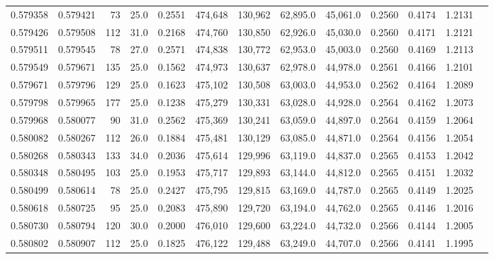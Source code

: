 \begin{tabular}{rrrrrrrrrrrrr}
0.579358 & 0.579421 &    73 & 25.0 &                                     0.2551 & 474,648 & 130,962 &  62,895.0 &  45,061.0 & 0.2560 & 0.4174 & 1.2131 \\
0.579426 & 0.579508 &   112 & 31.0 &                                     0.2168 & 474,760 & 130,850 &  62,926.0 &  45,030.0 & 0.2560 & 0.4171 & 1.2121 \\
0.579511 & 0.579545 &    78 & 27.0 &                                     0.2571 & 474,838 & 130,772 &  62,953.0 &  45,003.0 & 0.2560 & 0.4169 & 1.2113 \\
0.579549 & 0.579671 &   135 & 25.0 &                                     0.1562 & 474,973 & 130,637 &  62,978.0 &  44,978.0 & 0.2561 & 0.4166 & 1.2101 \\
0.579671 & 0.579796 &   129 & 25.0 &                                     0.1623 & 475,102 & 130,508 &  63,003.0 &  44,953.0 & 0.2562 & 0.4164 & 1.2089 \\
0.579798 & 0.579965 &   177 & 25.0 &                                     0.1238 & 475,279 & 130,331 &  63,028.0 &  44,928.0 & 0.2564 & 0.4162 & 1.2073 \\
0.579968 & 0.580077 &    90 & 31.0 &                                     0.2562 & 475,369 & 130,241 &  63,059.0 &  44,897.0 & 0.2564 & 0.4159 & 1.2064 \\
0.580082 & 0.580267 &   112 & 26.0 &                                     0.1884 & 475,481 & 130,129 &  63,085.0 &  44,871.0 & 0.2564 & 0.4156 & 1.2054 \\
0.580268 & 0.580343 &   133 & 34.0 &                                     0.2036 & 475,614 & 129,996 &  63,119.0 &  44,837.0 & 0.2565 & 0.4153 & 1.2042 \\
0.580348 & 0.580495 &   103 & 25.0 &                                     0.1953 & 475,717 & 129,893 &  63,144.0 &  44,812.0 & 0.2565 & 0.4151 & 1.2032 \\
0.580499 & 0.580614 &    78 & 25.0 &                                     0.2427 & 475,795 & 129,815 &  63,169.0 &  44,787.0 & 0.2565 & 0.4149 & 1.2025 \\
0.580618 & 0.580725 &    95 & 25.0 &                                     0.2083 & 475,890 & 129,720 &  63,194.0 &  44,762.0 & 0.2565 & 0.4146 & 1.2016 \\
0.580730 & 0.580794 &   120 & 30.0 &                                     0.2000 & 476,010 & 129,600 &  63,224.0 &  44,732.0 & 0.2566 & 0.4144 & 1.2005 \\
0.580802 & 0.580907 &   112 & 25.0 &                                     0.1825 & 476,122 & 129,488 &  63,249.0 &  44,707.0 & 0.2566 & 0.4141 & 1.1995 \\

\end{tabular}
